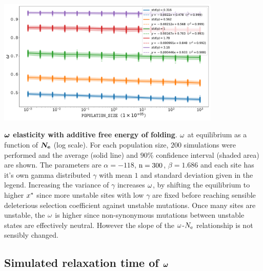 \documentclass{article}
\begin{document}
\begin{center}
	\includegraphics[width=0.8\textwidth] {artworks/SimuStab-GammaStd-Elasticity.pdf}
\end{center}
\textbf{$\bm{\omega}$ elasticity with additive free energy of folding}.
$\omega$ at equilibrium as a function of $\bm{N_{\mathrm{e}}}$ (log scale).
For each population size, $200$ simulations were performed and the average (solid line) and $90\%$ confidence interval (shaded area) are shown.
The parameters are $\alpha=-118$, $\text{n}=300$, $\beta=1.686$ and each site has it's own gamma distributed $\gamma$ with mean $1$ and standard deviation given in the legend.
Increasing the variance of $\gamma$ increases $\omega$, by shifting the equilibrium to higher $x^{*}$ since more unstable sites with low $\gamma$ are fixed before reaching sensible deleterious selection coefficient against unstable mutations. Once many sites are unstable, the $\omega$ is higher since non-synonymous mutations between unstable states are effectively neutral. However the slope of the $\omega$-$N_{\mathrm{e}}$ relationship is not sensibly changed.

\subsection{Simulated relaxation time of $\bm{\omega}$}
\end{document}
